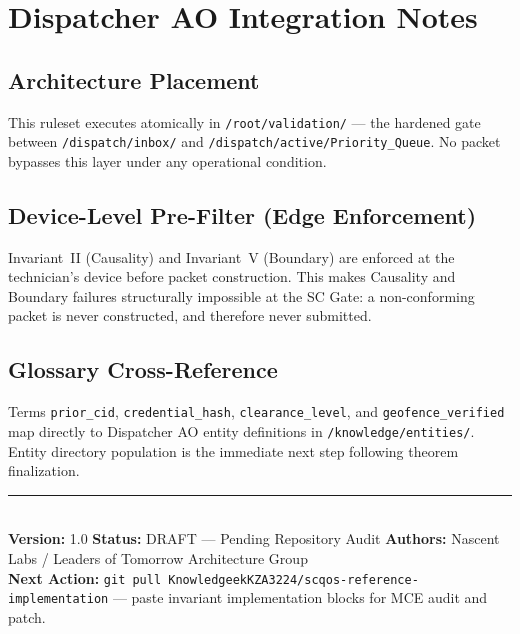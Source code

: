 \documentclass[11pt]{article}
\theoremstyle{invariantstyle}
\theoremstyle{defstyle}
\begin{document}
\section{Dispatcher AO Integration Notes}

\subsection*{Architecture Placement}
This ruleset executes atomically in \texttt{/root/validation/} — the hardened
gate between \texttt{/dispatch/inbox/} and \texttt{/dispatch/active/Priority\_Queue}.
No packet bypasses this layer under any operational condition.

\subsection*{Device-Level Pre-Filter (Edge Enforcement)}
Invariant~II (Causality) and Invariant~V (Boundary) are enforced at the
technician's device before packet construction. This makes Causality and
Boundary failures structurally impossible at the SC Gate: a non-conforming
packet is never constructed, and therefore never submitted.

\subsection*{Glossary Cross-Reference}
Terms \texttt{prior\_cid}, \texttt{credential\_hash}, \texttt{clearance\_level},
and \texttt{geofence\_verified} map directly to Dispatcher AO entity definitions
in \texttt{/knowledge/entities/}. Entity directory population is the
immediate next step following theorem finalization.

\vspace{16pt}
\rule{\textwidth}{0.4pt}\\[4pt]
\small
\textbf{Version:} 1.0 \quad
\textbf{Status:} DRAFT — Pending Repository Audit \quad
\textbf{Authors:} Nascent Labs / Leaders of Tomorrow Architecture Group\\
\textbf{Next Action:} \texttt{git pull KnowledgeekKZA3224/scqos-reference-implementation}
— paste invariant implementation blocks for MCE audit and patch.
\end{document}
